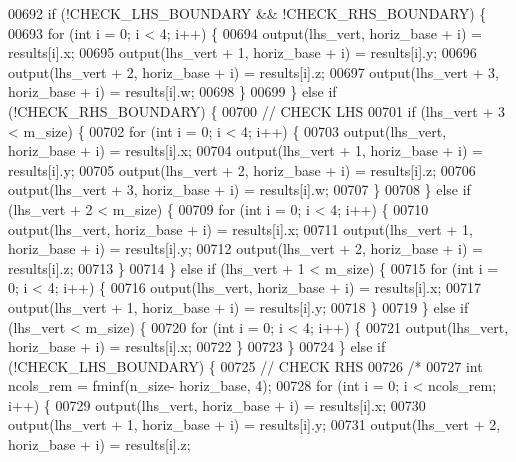 \begin{DoxyCode}
00692   \textcolor{keywordflow}{if} (!CHECK\_LHS\_BOUNDARY && !CHECK\_RHS\_BOUNDARY) \{
00693     \textcolor{keywordflow}{for} (\textcolor{keywordtype}{int} i = 0; i < 4; i++) \{
00694       output(lhs\_vert, horiz\_base + i) = results[i].x;
00695       output(lhs\_vert + 1, horiz\_base + i) = results[i].y;
00696       output(lhs\_vert + 2, horiz\_base + i) = results[i].z;
00697       output(lhs\_vert + 3, horiz\_base + i) = results[i].w;
00698     \}
00699   \} \textcolor{keywordflow}{else} \textcolor{keywordflow}{if} (!CHECK\_RHS\_BOUNDARY) \{
00700     \textcolor{comment}{// CHECK LHS}
00701     \textcolor{keywordflow}{if} (lhs\_vert + 3 < m\_size) \{
00702       \textcolor{keywordflow}{for} (\textcolor{keywordtype}{int} i = 0; i < 4; i++) \{
00703         output(lhs\_vert, horiz\_base + i) = results[i].x;
00704         output(lhs\_vert + 1, horiz\_base + i) = results[i].y;
00705         output(lhs\_vert + 2, horiz\_base + i) = results[i].z;
00706         output(lhs\_vert + 3, horiz\_base + i) = results[i].w;
00707       \}
00708     \} \textcolor{keywordflow}{else} \textcolor{keywordflow}{if} (lhs\_vert + 2 < m\_size) \{
00709       \textcolor{keywordflow}{for} (\textcolor{keywordtype}{int} i = 0; i < 4; i++) \{
00710         output(lhs\_vert, horiz\_base + i) = results[i].x;
00711         output(lhs\_vert + 1, horiz\_base + i) = results[i].y;
00712         output(lhs\_vert + 2, horiz\_base + i) = results[i].z;
00713       \}
00714     \} \textcolor{keywordflow}{else} \textcolor{keywordflow}{if} (lhs\_vert + 1 < m\_size) \{
00715       \textcolor{keywordflow}{for} (\textcolor{keywordtype}{int} i = 0; i < 4; i++) \{
00716         output(lhs\_vert, horiz\_base + i) = results[i].x;
00717         output(lhs\_vert + 1, horiz\_base + i) = results[i].y;
00718       \}
00719     \} \textcolor{keywordflow}{else} \textcolor{keywordflow}{if} (lhs\_vert  < m\_size) \{
00720       \textcolor{keywordflow}{for} (\textcolor{keywordtype}{int} i = 0; i < 4; i++) \{
00721         output(lhs\_vert, horiz\_base + i) = results[i].x;
00722       \}
00723     \}
00724   \} \textcolor{keywordflow}{else} \textcolor{keywordflow}{if} (!CHECK\_LHS\_BOUNDARY) \{
00725     \textcolor{comment}{// CHECK RHS}
00726     \textcolor{comment}{/*}
00727 \textcolor{comment}{    int ncols\_rem = fminf(n\_size- horiz\_base, 4);}
00728 \textcolor{comment}{    for (int i = 0; i < ncols\_rem; i++) \{}
00729 \textcolor{comment}{      output(lhs\_vert, horiz\_base + i) = results[i].x;}
00730 \textcolor{comment}{      output(lhs\_vert + 1, horiz\_base + i) = results[i].y;}
00731 \textcolor{comment}{      output(lhs\_vert + 2, horiz\_base + i) = results[i].z;}

\end{DoxyCode}
